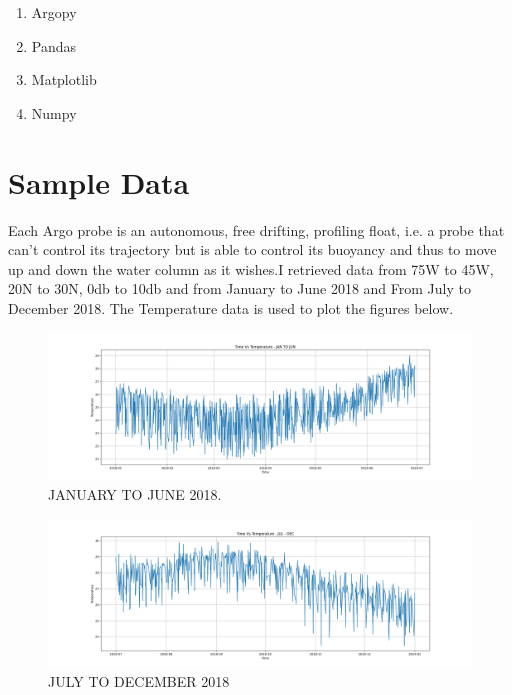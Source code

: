 \documentclass[20pt]{article}
\begin{document}
\begin{enumerate}
\item Argopy
\item Pandas 
\item Matplotlib
\item Numpy 
\end{enumerate}


\section{Sample Data}

Each Argo probe is an autonomous, free drifting, profiling float, i.e. a probe that can’t control its trajectory but is able to control its buoyancy and thus to move up and down the water column as it wishes.I retrieved data from 75W to 45W, 20N to 30N, 0db to 10db and from January to June 2018 and From July to December 2018. The Temperature data is used to plot the figures below.

\begin{figure}[h]
\begin{center}
\includegraphics[width=1\textwidth]{JAN_JUN.png} %
\caption{JANUARY TO JUNE 2018.}
\end{center}
\end{figure}

\begin{figure}[h]
\begin{center}
\includegraphics[width=1\textwidth]{JUL_DEC.png} %
\caption{JULY TO DECEMBER 2018}
\end{center}
\end{figure}
\end{document}
